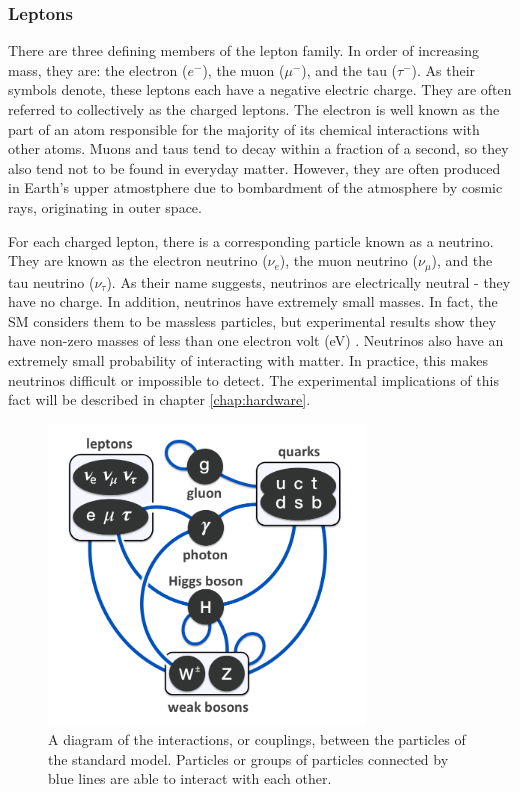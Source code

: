 \subsubsection*{Leptons}
There are three defining members of the lepton family. In order of
increasing mass, they are: the electron
($e^-$), the muon ($\mu^-$), and the tau ($\tau^-$). As their symbols
denote, these leptons each have a negative electric charge. They are
often referred to collectively as the charged leptons.
The electron is well known as the part of an atom responsible for the
majority of its chemical interactions with other atoms. Muons and taus
tend to decay within a fraction of a second, so they also tend not to
be found in everyday matter. However, they are often produced in
Earth's upper atmostphere due to bombardment of the atmosphere by
cosmic rays, originating in outer space.

For each charged lepton, there is a corresponding particle known as a
neutrino. They are known as the electron neutrino ($\nu_e$), the muon
neutrino ($\nu_{\mu}$), and the tau neutrino ($\nu_{\tau}$). As their
name suggests, neutrinos are electrically neutral - they have no
charge. In addition, neutrinos have extremely small masses. In fact,
the SM considers them to be massless particles, but experimental
results show they have non-zero masses of less than one electron volt
(eV) \cite{pdg}. Neutrinos also have an extremely small probability of
interacting with matter. In practice, this makes neutrinos
difficult or impossible to detect. The experimental implications of
this fact will be described in chapter \ref{chap:hardware}.

\begin{figure}[h]
  \centering
  \includegraphics[width=0.75\textwidth]{figures/couplings.png}
  \caption{A diagram of the interactions, or couplings,
    between the particles of the standard model. Particles or groups
    of particles connected by blue lines are able to interact with
    each other.}
  \label{fig:couplings}
\end{figure}

